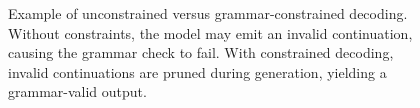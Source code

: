 \begin{figure}[t]
{%
}
\caption{
Example of unconstrained versus grammar-constrained decoding.
Without constraints, the model may emit an invalid continuation, causing the grammar check to fail.
With constrained decoding, invalid continuations are pruned during generation, yielding a grammar-valid output.
}
\label{fig:constraint-pass-fail}
\end{figure}